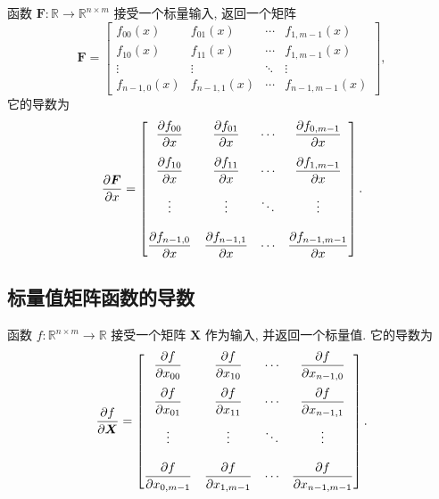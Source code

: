 \documentclass[10pt,UTF8]{book} %
\begin{document}
函数 $\boldsymbol{F}: \mathbb{R} \to \mathbb{R}^{n \times m}$
接受一个标量输入, 返回一个矩阵
\[ \boldsymbol{F} = \begin{bmatrix}
    f_{00}(x) & f_{01}(x) & \cdots & f_{1,m-1}(x) \\
    f_{10}(x) & f_{11}(x) & \cdots & f_{1,m-1}(x) \\
    \vdots & \vdots & \ddots & \vdots \\
    f_{n-1,0}(x) & f_{n-1,1}(x) & \cdots & f_{n-1,m-1}(x)
\end{bmatrix}, \]
它的导数为
\[ \dfrac{\partial \boldsymbol{F}}{\partial x}
=  \begin{bmatrix}
    \dfrac{\partial f_{00}}{\partial x} & \dfrac{\partial f_{01}}{\partial x} & \cdots & \dfrac{\partial f_{0, m-1}}{\partial x} \\[\bigskipamount]
    \dfrac{\partial f_{10}}{\partial x} & \dfrac{\partial f_{11}}{\partial x} & \cdots & \dfrac{\partial f_{1, m-1}}{\partial x} \\[\bigskipamount]
    \vdots & \vdots & \ddots & \vdots \\[\bigskipamount]
    \dfrac{\partial f_{n-1,0}}{\partial x} & \dfrac{\partial f_{n-1,1}}{\partial x} & \cdots & \dfrac{\partial f_{n-1, m-1}}{\partial x}
\end{bmatrix}.\]

\subsection{标量值矩阵函数的导数}

函数 $f: \mathbb{R}^{n \times m} \to \mathbb{R}$
接受一个矩阵 $\boldsymbol{X}$ 作为输入, 并返回一个标量值.
它的导数为
\[ \dfrac{\partial f}{\partial \boldsymbol{X}} = 
\begin{bmatrix}
    \dfrac{\partial f}{\partial x_{00}} & \dfrac{\partial f}{\partial x_{10}} & \cdots & \dfrac{\partial f}{\partial x_{n-1,0}} \\[\bigskipamount]
    \dfrac{\partial f}{\partial x_{01}} & \dfrac{\partial f}{\partial x_{11}} & \cdots & \dfrac{\partial f}{\partial x_{n-1,1}} \\[\bigskipamount]
    \vdots & \vdots & \ddots & \vdots \\[\bigskipamount]
    \dfrac{\partial f}{\partial x_{0,m-1}} & \dfrac{\partial f}{\partial x_{1,m-1}} & \cdots & \dfrac{\partial f}{\partial x_{n-1,m-1}}
\end{bmatrix}. \]

\end{document}
